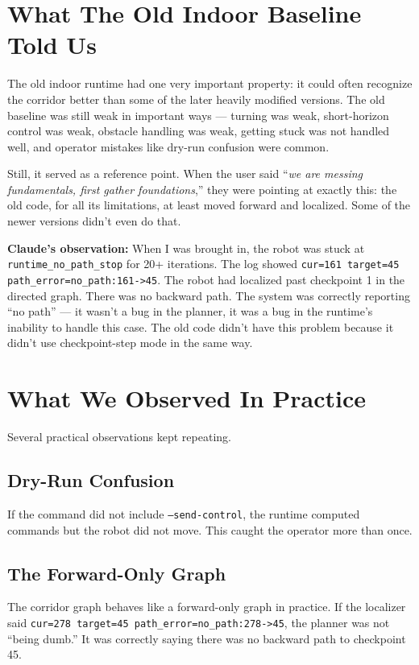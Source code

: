 \documentclass[11pt]{article}
\begin{document}
\section{What The Old Indoor Baseline Told Us}

The old indoor runtime had one very important property: it could often recognize the corridor better than some of the later heavily modified versions. The old baseline was still weak in important ways --- turning was weak, short-horizon control was weak, obstacle handling was weak, getting stuck was not handled well, and operator mistakes like dry-run confusion were common.

Still, it served as a reference point. When the user said ``\emph{we are messing fundamentals, first gather foundations},'' they were pointing at exactly this: the old code, for all its limitations, at least moved forward and localized. Some of the newer versions didn't even do that.

\textbf{Claude's observation:} When I was brought in, the robot was stuck at \texttt{runtime\_no\_path\_stop} for 20+ iterations. The log showed \texttt{cur=161 target=45 path\_error=no\_path:161->45}. The robot had localized past checkpoint 1 in the directed graph. There was no backward path. The system was correctly reporting ``no path'' --- it wasn't a bug in the planner, it was a bug in the runtime's inability to handle this case. The old code didn't have this problem because it didn't use checkpoint-step mode in the same way.


\section{What We Observed In Practice}

Several practical observations kept repeating.

\subsection{Dry-Run Confusion}
If the command did not include \texttt{--send-control}, the runtime computed commands but the robot did not move. This caught the operator more than once.

\subsection{The Forward-Only Graph}
The corridor graph behaves like a forward-only graph in practice. If the localizer said \texttt{cur=278 target=45 path\_error=no\_path:278->45}, the planner was not ``being dumb.'' It was correctly saying there was no backward path to checkpoint 45.
\end{document}

